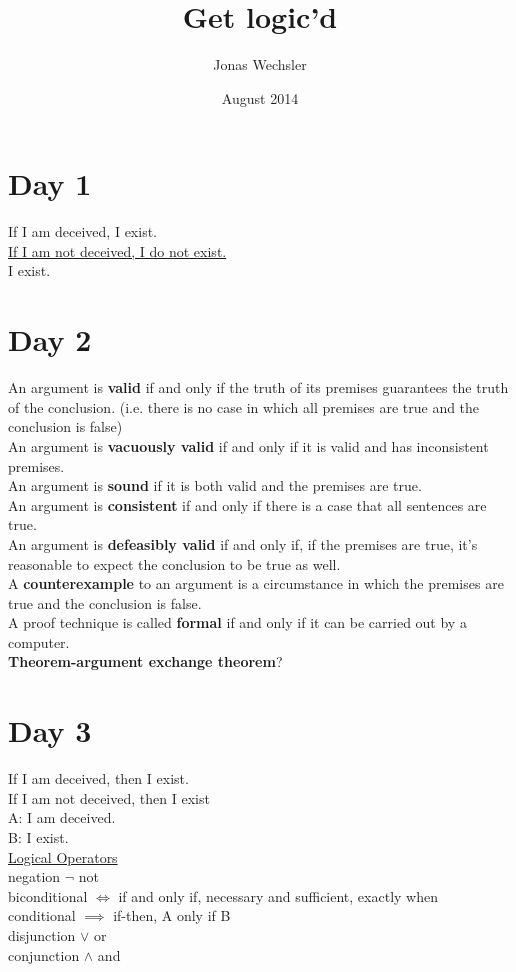 \documentclass{article}
\title{Get logic'd}
\author{Jonas Wechsler}
\date{August 2014}
\begin{document}
\maketitle

\section{Day 1}
If I am deceived, I exist.
\\ \underline{If I am not deceived, I do not exist.}
\\ I exist.
\section{Day 2}
An argument is \textbf{valid} if and only if the truth of its premises guarantees the truth of the conclusion. (i.e. there is no case in which all premises are true and the conclusion is false)
\\An argument is \textbf{vacuously valid} if and only if it is valid and has inconsistent premises.
\\An argument is \textbf{sound} if it is both valid and the premises are true.
\\An argument is \textbf{consistent} if and only if there is a case that all sentences are true.
\\An argument is \textbf{defeasibly valid} if and only if, if the premises are true, it's reasonable to expect the conclusion to be true as well.
\\A \textbf{counterexample} to an argument is a circumstance in which the premises are true and the conclusion is false.
\\A proof technique is called \textbf{formal} if and only if it can be carried out by a computer.
\\\textbf{Theorem-argument exchange theorem}?
\section{Day 3}
If I am deceived, then I exist.\\
If I am not deceived, then I exist\\
A: I am deceived.\\
B: I exist.\\
\underline{Logical Operators}\\
negation $\lnot$ not\\
biconditional $\iff$ if and only if, necessary and sufficient, exactly when\\
conditional $\implies$ if-then, A only if B\\
disjunction $\lor$ or\\
conjunction $\land$ and\\
\end{document}
